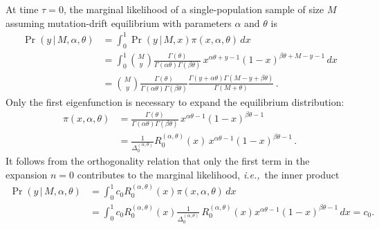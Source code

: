 \documentclass[preprint]{elsarticle}
\newcommand\given{{\,|\,}}
\newcommand\ie{{\it i.e.,}}
\begin{document}
At time $\tau=0$, the marginal likelihood of a single-population sample of size $M$ assuming mutation-drift equilibrium with parameters $\alpha$ and $\theta$ is
\begin{equation}
\begin{split}
    \Pr(y\given M,\alpha,\theta)
    &=\int_0^1 \Pr(y\given M,x) \pi(x,\alpha,\theta)\,dx\\
    &=\int_0^1 \binom{M}{y}\frac{\Gamma(\theta)}{\Gamma(\alpha\theta)\Gamma(\beta\theta)}\,x^{\alpha\theta+y-1}(1-x)^{\beta\theta+M-y-1}\,dx\\
    &=\binom{M}{y}\frac{\Gamma(\theta)}{\Gamma(\alpha\theta)\Gamma(\beta\theta)}
    \frac{\Gamma(y+\alpha\theta)\Gamma(M-y+\beta\theta)}{\Gamma(M+\theta)}\,.
\end{split}
\end{equation}
Only the first eigenfunction is necessary to expand the equilibrium distribution:
\begin{equation}
\begin{split}
    \pi(x,\alpha,\theta)&=\frac{\Gamma(\theta)}{\Gamma(\alpha\theta)\Gamma(\beta\theta)}\,x^{\alpha\theta-1}(1-x)^{\beta\theta-1}\\
    &=\frac{1}{\Delta_0^{(\alpha,\theta)}}R_0^{(\alpha,\theta)}(x)\,x^{\alpha\theta-1}(1-x)^{\beta\theta-1}\,.
\end{split}
\end{equation}
It follows from the orthogonality relation that only the first term in the expansion $n=0$ contributes to the marginal likelihood, \ie\ the inner product
\begin{equation}
\begin{split}
    \Pr(y\given M,\alpha,\theta)&=\int_0^1 c_0 R_0^{(\alpha,\theta)}(x) \pi(x,\alpha,\theta)\,dx\\
    &=\int_0^1 c_0 R_0^{(\alpha,\theta)}(x) \frac{1}{\Delta_0^{(\alpha,\theta)}}\,R_0^{(\alpha,\theta)}(x) x^{\alpha\theta-1}(1-x)^{\beta\theta-1}\,dx
    =c_0.
\end{split}
\end{equation}
\end{document}
